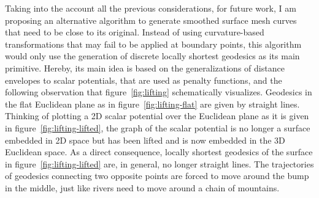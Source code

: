 \documentclass[crop=false]{stdlocal}
\begin{document}
  Taking into the account all the previous considerations, for future work, I am proposing an alternative algorithm to generate smoothed surface mesh curves that need to be close to its original.
  Instead of using curvature-based transformations that may fail to be applied at boundary points, this algorithm would only use the generation of discrete locally shortest geodesics as its main primitive.
  Hereby, its main idea is based on the generalizations of distance envelopes to scalar potentials, that are used as penalty functions, and the following observation that figure~\ref{fig:lifting} schematically visualizes.
  Geodesics in the flat Euclidean plane as in figure~\ref{fig:lifting-flat} are given by straight lines.
  Thinking of plotting a 2D scalar potential over the Euclidean plane as it is given in figure~\ref{fig:lifting-lifted}, the graph of the scalar potential is no longer a surface embedded in 2D space but has been lifted and is now embedded in the 3D Euclidean space.
  As a direct consequence, locally shortest geodesics of the surface in figure~\ref{fig:lifting-lifted} are, in general, no longer straight lines.
  The trajectories of geodesics connecting two opposite points are forced to move around the bump in the middle, just like rivers need to move around a chain of mountains.
\end{document}
